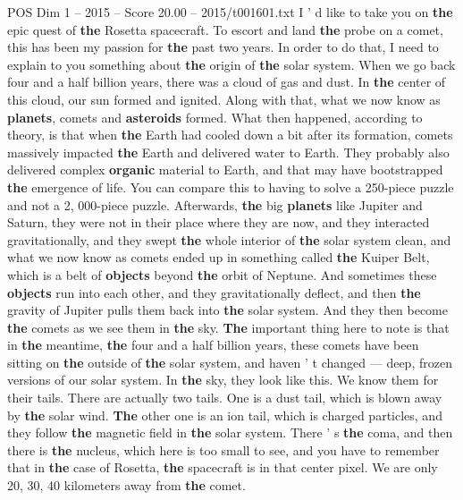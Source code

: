 \begin{textsample}{POS Dim 1 – 2015 – Score 20.00 – 2015/t001601.txt}  \label{ex:f1_pos_041}
I ' d like to take you on \textbf{the} epic quest of \textbf{the} Rosetta spacecraft.
To escort and land \textbf{the} probe on a comet, this has been my passion for \textbf{the} past two years.
In order to do that, I need to explain to you something about \textbf{the} origin of \textbf{the} solar system.
When we go back four and a half billion years, there was a cloud of gas and dust.
In \textbf{the} center of this cloud, our sun formed and ignited.
Along with that, what we now know as \textbf{planets}, comets and \textbf{asteroids} formed.
What then happened, according to theory, is that when \textbf{the} Earth had cooled down a bit after its formation, comets massively impacted \textbf{the} Earth and delivered water to Earth.
They probably also delivered complex \textbf{organic} material to Earth, and that may have bootstrapped \textbf{the} emergence of life.
You can compare this to having to solve a 250-piece puzzle and not a 2, 000-piece puzzle.
Afterwards, \textbf{the} big \textbf{planets} like Jupiter and Saturn, they were not in their place where they are now, and they interacted gravitationally, and they swept \textbf{the} whole interior of \textbf{the} solar system clean, and what we now know as comets ended up in something called \textbf{the} Kuiper Belt, which is a belt of \textbf{objects} beyond \textbf{the} orbit of Neptune.
And sometimes these \textbf{objects} run into each other, and they gravitationally deflect, and then \textbf{the} gravity of Jupiter pulls them back into \textbf{the} solar system.
And they then become \textbf{the} comets as we see them in \textbf{the} sky. \textbf{The} important thing here to note is that in \textbf{the} meantime, \textbf{the} four and a half billion years, these comets have been sitting on \textbf{the} outside of \textbf{the} solar system, and haven ' t changed — deep, frozen versions of our solar system.
In \textbf{the} sky, they look like this.
We know them for their tails.
There are actually two tails.
One is a dust tail, which is blown away by \textbf{the} solar wind. \textbf{The} other one is an ion tail, which is charged particles, and they follow \textbf{the} magnetic field in \textbf{the} solar system.
There ' s \textbf{the} coma, and then there is \textbf{the} nucleus, which here is too small to see, and you have to remember that in \textbf{the} case of Rosetta, \textbf{the} spacecraft is in that center pixel.
We are only 20, 30, 40 kilometers away from \textbf{the} comet.

\end{textsample}
